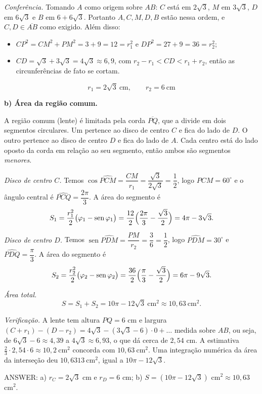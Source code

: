 \documentclass{article}%
\begin{document}
\emph{Conferência.} Tomando $A$ como origem sobre $AB$: $C$ está em $2\sqrt3$, $M$ em $3\sqrt3$, $D$ em $6\sqrt3$ e $B$ em $6+6\sqrt3$. Portanto $A,C,M,D,B$ estão nessa ordem, e $C,D\in\overline{AB}$ como exigido. Além disso:
\begin{itemize}
\item $CP^2=CM^2+PM^2=3+9=12=r_1^2$ e $DP^2=27+9=36=r_2^2$;
\item $CD=\sqrt3+3\sqrt3=4\sqrt3\approx6{,}9$, com $r_2-r_1<CD<r_1+r_2$, então as circunferências de fato se cortam.
\end{itemize}

\[
\boxed{r_1=2\sqrt3\ \text{cm},\qquad r_2=6\ \text{cm}}
\]

\medskip
\textbf{b) Área da região comum.}

A região comum (lente) é limitada pela corda $\overline{PQ}$, que a divide em dois segmentos circulares. Um pertence ao disco de centro $C$ e fica do lado de $D$. O outro pertence ao disco de centro $D$ e fica do lado de $A$. Cada centro está do lado oposto da corda em relação ao seu segmento, então ambos são segmentos \emph{menores}.

\emph{Disco de centro $C$.} Temos $\cos\widehat{PCM}=\dfrac{CM}{r_1}=\dfrac{\sqrt3}{2\sqrt3}=\dfrac12$, logo $\widehat{PCM}=60^\circ$ e o ângulo central é $\widehat{PCQ}=\dfrac{2\pi}{3}$. A área do segmento é
\[
S_1=\frac{r_1^2}{2}\bigl(\varphi_1-\operatorname{sen}\varphi_1\bigr)=\frac{12}{2}\Bigl(\frac{2\pi}{3}-\frac{\sqrt3}{2}\Bigr)=4\pi-3\sqrt3 .
\]

\emph{Disco de centro $D$.} Temos $\operatorname{sen}\widehat{PDM}=\dfrac{PM}{r_2}=\dfrac36=\dfrac12$, logo $\widehat{PDM}=30^\circ$ e $\widehat{PDQ}=\dfrac{\pi}{3}$. A área do segmento é
\[
S_2=\frac{r_2^2}{2}\bigl(\varphi_2-\operatorname{sen}\varphi_2\bigr)=\frac{36}{2}\Bigl(\frac{\pi}{3}-\frac{\sqrt3}{2}\Bigr)=6\pi-9\sqrt3 .
\]

\emph{Área total.}
\[
S=S_1+S_2=10\pi-12\sqrt3\ \text{cm}^2\approx 10{,}63\ \text{cm}^2 .
\]

\emph{Verificação.} A lente tem altura $PQ=6$ cm e largura $(C+r_1)-(D-r_2)=4\sqrt3-(3\sqrt3-6)\cdot0+\dots$ medida sobre $AB$, ou seja, de $6\sqrt3-6\approx4{,}39$ a $4\sqrt3\approx6{,}93$, o que dá cerca de $2{,}54$ cm. A estimativa $\tfrac23\cdot2{,}54\cdot6\approx10{,}2\ \text{cm}^2$ concorda com $10{,}63\ \text{cm}^2$. Uma integração numérica da área da interseção deu $10{,}6313\ \text{cm}^2$, igual a $10\pi-12\sqrt3$.

\medskip
ANSWER: a) $r_C=2\sqrt3$ cm e $r_D=6$ cm; b) $S=(10\pi-12\sqrt3)$ cm$^2\approx10{,}63$ cm$^2$.%
\newpage%
\end{document}
